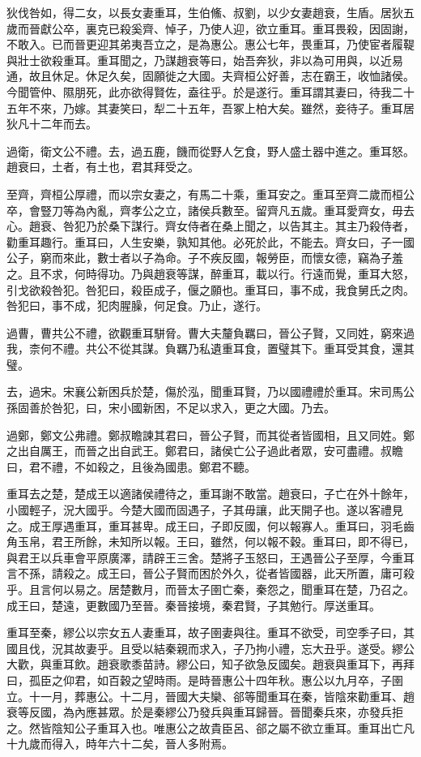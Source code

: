 狄伐咎如，得二女，以長女妻重耳，生伯鯈、叔劉，以少女妻趙衰，生盾。居狄五歲而晉獻公卒，裏克已殺奚齊、悼子，乃使人迎，欲立重耳。重耳畏殺，因固謝，不敢入。已而晉更迎其弟夷吾立之，是為惠公。惠公七年，畏重耳，乃使宦者履鞮與壯士欲殺重耳。重耳聞之，乃謀趙衰等曰，始吾奔狄，非以為可用與，以近易通，故且休足。休足久矣，固願徙之大國。夫齊桓公好善，志在霸王，收恤諸侯。今聞管仲、隰朋死，此亦欲得賢佐，盍往乎。於是遂行。重耳謂其妻曰，待我二十五年不來，乃嫁。其妻笑曰，犁二十五年，吾冢上柏大矣。雖然，妾待子。重耳居狄凡十二年而去。

過衛，衛文公不禮。去，過五鹿，饑而從野人乞食，野人盛土器中進之。重耳怒。趙衰曰，土者，有土也，君其拜受之。

至齊，齊桓公厚禮，而以宗女妻之，有馬二十乘，重耳安之。重耳至齊二歲而桓公卒，會豎刀等為內亂，齊孝公之立，諸侯兵數至。留齊凡五歲。重耳愛齊女，毋去心。趙衰、咎犯乃於桑下謀行。齊女侍者在桑上聞之，以告其主。其主乃殺侍者，勸重耳趣行。重耳曰，人生安樂，孰知其他。必死於此，不能去。齊女曰，子一國公子，窮而來此，數士者以子為命。子不疾反國，報勞臣，而懷女德，竊為子羞之。且不求，何時得功。乃與趙衰等謀，醉重耳，載以行。行遠而覺，重耳大怒，引戈欲殺咎犯。咎犯曰，殺臣成子，偃之願也。重耳曰，事不成，我食舅氏之肉。咎犯曰，事不成，犯肉腥臊，何足食。乃止，遂行。

過曹，曹共公不禮，欲觀重耳駢脅。曹大夫釐負羈曰，晉公子賢，又同姓，窮來過我，柰何不禮。共公不從其謀。負羈乃私遺重耳食，置璧其下。重耳受其食，還其璧。

去，過宋。宋襄公新困兵於楚，傷於泓，聞重耳賢，乃以國禮禮於重耳。宋司馬公孫固善於咎犯，曰，宋小國新困，不足以求入，更之大國。乃去。

過鄭，鄭文公弗禮。鄭叔瞻諫其君曰，晉公子賢，而其從者皆國相，且又同姓。鄭之出自厲王，而晉之出自武王。鄭君曰，諸侯亡公子過此者眾，安可盡禮。叔瞻曰，君不禮，不如殺之，且後為國患。鄭君不聽。

重耳去之楚，楚成王以適諸侯禮待之，重耳謝不敢當。趙衰曰，子亡在外十餘年，小國輕子，況大國乎。今楚大國而固遇子，子其毋讓，此天開子也。遂以客禮見之。成王厚遇重耳，重耳甚卑。成王曰，子即反國，何以報寡人。重耳曰，羽毛齒角玉帛，君王所餘，未知所以報。王曰，雖然，何以報不穀。重耳曰，即不得已，與君王以兵車會平原廣澤，請辟王三舍。楚將子玉怒曰，王遇晉公子至厚，今重耳言不孫，請殺之。成王曰，晉公子賢而困於外久，從者皆國器，此天所置，庸可殺乎。且言何以易之。居楚數月，而晉太子圉亡秦，秦怨之，聞重耳在楚，乃召之。成王曰，楚遠，更數國乃至晉。秦晉接境，秦君賢，子其勉行。厚送重耳。

重耳至秦，繆公以宗女五人妻重耳，故子圉妻與往。重耳不欲受，司空季子曰，其國且伐，況其故妻乎。且受以結秦親而求入，子乃拘小禮，忘大丑乎。遂受。繆公大歡，與重耳飲。趙衰歌黍苗詩。繆公曰，知子欲急反國矣。趙衰與重耳下，再拜曰，孤臣之仰君，如百穀之望時雨。是時晉惠公十四年秋。惠公以九月卒，子圉立。十一月，葬惠公。十二月，晉國大夫欒、郤等聞重耳在秦，皆陰來勸重耳、趙衰等反國，為內應甚眾。於是秦繆公乃發兵與重耳歸晉。晉聞秦兵來，亦發兵拒之。然皆陰知公子重耳入也。唯惠公之故貴臣呂、郤之屬不欲立重耳。重耳出亡凡十九歲而得入，時年六十二矣，晉人多附焉。

